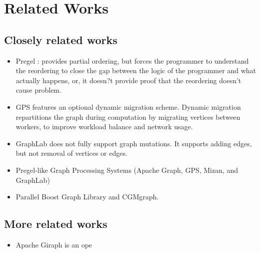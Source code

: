 \section{Related Works}
\subsection{Closely related works}
\begin{frame}
\begin{itemize}
  \item Pregel : provides partial ordering, but forces the programmer to understand the reordering to close the gap between the logic of the programmer and what actually happens, or, it doesn?t provide proof that the reordering doesn't cause problem.
  \item GPS features an optional dynamic migration scheme. Dynamic migration repartitions the graph during computation by migrating vertices between workers, to improve workload balance and network usage. 
  \item GraphLab does not fully support graph mutations. It supports adding edges, but not removal of vertices or edges.
  \item Pregel-like Graph Processing Systems (Apache Graph, GPS, Mizan, and GraphLab) 
  \item Parallel Boost Graph Library and CGMgraph. 
  \end{itemize}
\end{frame}

\subsection{More related works}
\begin{frame}
\begin{itemize}
  \item Apache Giraph is an ope
  \end{itemize}
\end{frame}